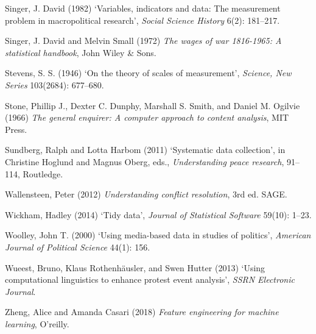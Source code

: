 \documentclass[12pt,twoside]{reedthesis}
\begin{document}
\hypertarget{ref-singer_variables_1982}{}
Singer, J. David (1982) `Variables, indicators and data: The measurement
problem in macropolitical research', \emph{Social Science History} 6(2):
181--217.

\hypertarget{ref-singer_wages_1972}{}
Singer, J. David and Melvin Small (1972) \emph{The wages of war
1816-1965: A statistical handbook}, John Wiley \& Sons.

\hypertarget{ref-stevens_theory_1946}{}
Stevens, S. S. (1946) `On the theory of scales of measurement',
\emph{Science, New Series} 103(2684): 677--680.

\hypertarget{ref-stone_general_1966}{}
Stone, Phillip J., Dexter C. Dunphy, Marshall S. Smith, and Daniel M.
Ogilvie (1966) \emph{The general enquirer: A computer approach to
content analysis}, MIT Press.

\hypertarget{ref-sundberg_systematic_2011}{}
Sundberg, Ralph and Lotta Harbom (2011) `Systematic data collection', in
Christine Hoglund and Magnus Oberg, eds., \emph{Understanding peace
research}, 91--114, Routledge.

\hypertarget{ref-wallensteen_understanding_2012}{}
Wallensteen, Peter (2012) \emph{Understanding conflict resolution}, 3rd
ed. SAGE.

\hypertarget{ref-wickham_tidy_2014}{}
Wickham, Hadley (2014) `Tidy data', \emph{Journal of Statistical
Software} 59(10): 1--23.

\hypertarget{ref-woolley_using_2000}{}
Woolley, John T. (2000) `Using media-based data in studies of politics',
\emph{American Journal of Political Science} 44(1): 156.

\hypertarget{ref-wueest_using_2013}{}
Wueest, Bruno, Klaus Rothenhäusler, and Swen Hutter (2013) `Using
computational linguistics to enhance protest event analysis', \emph{SSRN
Electronic Journal}.

\hypertarget{ref-zheng_feature_2018}{}
Zheng, Alice and Amanda Casari (2018) \emph{Feature engineering for
machine learning}, O'reilly.


\end{document}
